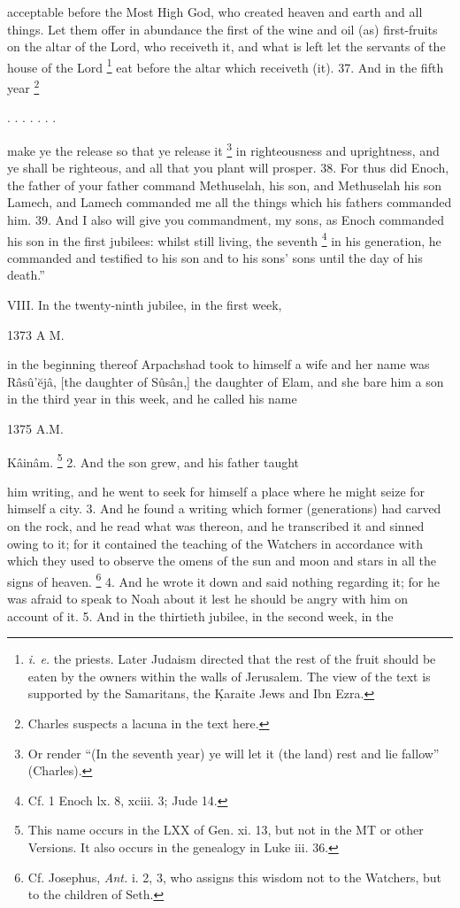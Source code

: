 acceptable before the Most High God, who created heaven and earth and all things. Let them offer in abundance the first of the wine and oil (as) first-fruits on the altar of the Lord, who receiveth it, and what is left let the servants of the house of the Lord \footnote{\emph{i. e.} the priests. Later Judaism directed that the rest of the fruit should be eaten by the owners within the walls of Jerusalem. The view of the text is supported by the Samaritans, the \d{K}araite Jews and Ibn Ezra.} eat before the altar which receiveth (it). 37. And in the fifth year \footnote{Charles suspects a lacuna in the text here.}

. . . . . . .

make ye the release so that ye release it \footnote{Or render ``(In the seventh year) ye will let it (the land) rest and lie fallow'' (Charles).} in righteousness and uprightness, and ye shall be righteous, and all that you plant will prosper. 38. For thus did Enoch, the father of your father command Methuselah, his son, and Methuselah his son Lamech, and Lamech commanded me all the things which his fathers commanded him. 39. And I also will give you commandment, my sons, as Enoch commanded his son in the first jubilees: whilst still living, the seventh \footnote{Cf. 1 Enoch lx. 8, xciii. 3; Jude 14.} in his generation, he commanded and testified to his son and to his sons' sons until the day of his death.''


VIII. In the twenty-ninth jubilee, in the first week,

1373 A M.

in the beginning thereof Arpachshad took to himself a wife and her name was Râsû’ĕjâ, [the daughter of Sûsân,] the daughter of Elam, and she bare him a son in the third year in this week, and he called his name

1375 A.M.

Kâinâm. \footnote{This name occurs in the LXX of Gen. xi. 13, but not in the MT or other Versions. It also occurs in the genealogy in Luke iii. 36.} 2. And the son grew, and his father taught

him writing, and he went to seek for himself a place where he might seize for himself a city. 3. And he found a writing which former (generations) had carved on the rock, and he read what was thereon, and he transcribed it and sinned owing to it; for it contained the teaching of the Watchers in accordance with which they used to observe the omens of the sun and moon and stars in all the signs of heaven. \footnote{Cf. Josephus, \emph{Ant.} i. 2, 3, who assigns this wisdom not to the Watchers, but to the children of Seth.} 4. And he wrote it down and said nothing regarding it; for he was afraid to speak to Noah about it lest he should be angry with him on account of it. 5. And in the thirtieth jubilee, in the second week, in the

